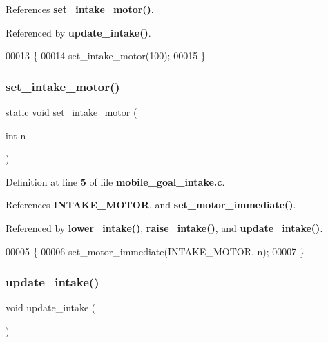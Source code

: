 References \textbf{ set\+\_\+intake\+\_\+motor()}.



Referenced by \textbf{ update\+\_\+intake()}.


\begin{DoxyCode}
00013                            \{
00014   set_intake_motor(100);
00015 \}
\end{DoxyCode}
\mbox{\label{mobile__goal__intake_8c_a8f215023832ba515d7b4535e3ae07498}} 
\subsubsection{set\+\_\+intake\+\_\+motor()}
{\footnotesize\ttfamily static void set\+\_\+intake\+\_\+motor (\begin{DoxyParamCaption}\item[{int}]{n }\end{DoxyParamCaption})\hspace{0.3cm}{\ttfamily [static]}}



Definition at line \textbf{ 5} of file \textbf{ mobile\+\_\+goal\+\_\+intake.\+c}.



References \textbf{ I\+N\+T\+A\+K\+E\+\_\+\+M\+O\+T\+OR}, and \textbf{ set\+\_\+motor\+\_\+immediate()}.



Referenced by \textbf{ lower\+\_\+intake()}, \textbf{ raise\+\_\+intake()}, and \textbf{ update\+\_\+intake()}.


\begin{DoxyCode}
00005                                     \{
00006   set_motor_immediate(INTAKE_MOTOR, n);
00007 \}
\end{DoxyCode}
\mbox{\label{mobile__goal__intake_8c_a5d7bad8a208988af743fd2e68f111286}} 
\subsubsection{update\+\_\+intake()}
{\footnotesize\ttfamily void update\+\_\+intake (\begin{DoxyParamCaption}{ }\end{DoxyParamCaption})}



